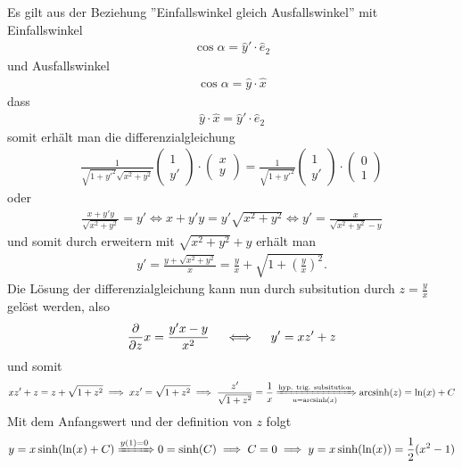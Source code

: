 \documentclass[ngerman]{report}
\begin{document}
    \begin{answer}
        Es gilt aus der Beziehung ''Einfallswinkel gleich Ausfallswinkel'' mit Einfallswinkel
        \begin{align*}
            \cos\alpha = \hat{y}'\cdot \hat{e}_2 
        \end{align*}
        und Ausfallswinkel
        \begin{align*}
            \cos\alpha = \hat{y}\cdot \hat{x}
        \end{align*}
        dass
        \begin{align*}
            \hat{y}\cdot \hat{x} = \hat{y}'\cdot \hat{e}_2 
        \end{align*}
        somit erhält man die differenzialgleichung
        \begin{align*}
            \frac{1}{\sqrt{1+y'^2}\sqrt{x^2+y^2}}\begin{pmatrix}
                1\\
                y'
            \end{pmatrix}\cdot \begin{pmatrix}
                x\\
                y
            \end{pmatrix} = \frac{1}{\sqrt{1+y'^2}}\begin{pmatrix}
                1\\
                y'
            \end{pmatrix}\cdot \begin{pmatrix}
                0\\
                1
            \end{pmatrix}
        \end{align*}
        oder
        \begin{align*}
            \frac{x+y'y}{\sqrt{x^2+y^2}}  = y'\iff x+y'y = y'\sqrt{x^2+y^2} \iff y' = \frac{x}{\sqrt{x^2+y^2}-y} 
        \end{align*}
        und somit durch erweitern mit $\sqrt{x^2+y^2}+y$ erhält man
        \begin{align*}
            y' = \frac{y+\sqrt{x^2+y^2}}{x} = \frac{y}{x} + \sqrt{1+\left(\frac{y}{x}\right)^2}.
        \end{align*}
        Die Lösung der differenzialgleichung kann nun durch subsitution durch $z = \frac{y}{x}$ gelöst werden, also
        \begin{align*}
            \frac{\partial }{\partial z}{x} = \frac{y'x-y}{x^2} \quad \iff \quad y' = xz'+z
        \end{align*}
        und somit
        \begin{align*}
            xz'+z = z + \sqrt{1+z^2} \implies xz' = \sqrt{1+z^2} \implies \frac{z'}{\sqrt{1+z^2}} = \frac{1}{x} \xRightarrow[u = \operatorname{arcsinh}(x)]{\text{hyp. trig. subsitution}} \operatorname{arcsinh}(z) = \ln(x)+C
        \end{align*}
        Mit dem Anfangswert und der definition von $z$ folgt
        \begin{align*}
            y = x\sinh(\ln(x)+C) \xRightarrow{y(1) = 0} 0 = \sinh(C) \implies C = 0 \implies y = x\sinh(\ln(x)) = \frac{1}{2}(x^2-1) 
        \end{align*}
    \end{answer}
\end{document}
